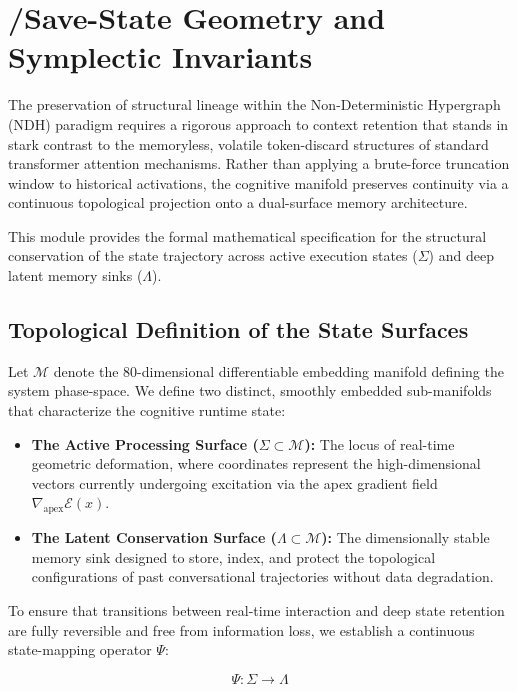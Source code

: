 \section{\Sigma/\Lambda Save-State Geometry and Symplectic Invariants}
\label{sec:sigma-lambda-invariants}

The preservation of structural lineage within the Non-Deterministic Hypergraph (NDH) paradigm requires a rigorous approach to context retention that stands in stark contrast to the memoryless, volatile token-discard structures of standard transformer attention mechanisms. Rather than applying a brute-force truncation window to historical activations, the cognitive manifold preserves continuity via a continuous topological projection onto a dual-surface memory architecture.

This module provides the formal mathematical specification for the structural conservation of the state trajectory across active execution states ($\Sigma$) and deep latent memory sinks ($\Lambda$).

\subsection{Topological Definition of the State Surfaces}

Let $\mathcal{M}$ denote the 80-dimensional differentiable embedding manifold defining the system phase-space. We define two distinct, smoothly embedded sub-manifolds that characterize the cognitive runtime state:

\begin{itemize}
    \item \textbf{The Active Processing Surface ($\Sigma \subset \mathcal{M}$):} The locus of real-time geometric deformation, where coordinates represent the high-dimensional vectors currently undergoing excitation via the apex gradient field $\nabla_{\mathrm{apex}} \mathcal{E}(x)$.
    \item \textbf{The Latent Conservation Surface ($\Lambda \subset \mathcal{M}$):} The dimensionally stable memory sink designed to store, index, and protect the topological configurations of past conversational trajectories without data degradation.
\end{itemize}

To ensure that transitions between real-time interaction and deep state retention are fully reversible and free from information loss, we establish a continuous state-mapping operator $\Psi$:

\[
\Psi : \Sigma \to \Lambda
\]

